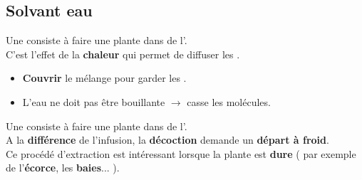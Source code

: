 \subsection{Solvant eau}

\label{infusion}
\begin{Defi}[Infusion]
	
	Une  consiste à faire  une plante dans de l'.\\

	C'est l'effet de la \textbf{chaleur} qui permet de diffuser les .
	
\end{Defi}



\begin{Remarque}
	\begin{itemize}[label = \faPen]
		\item \textbf{Couvrir} le mélange pour garder les .
		\item L'eau ne doit pas être bouillante $\longrightarrow$ casse les molécules.
	\end{itemize}
\end{Remarque}

\label{decoction}
\begin{Defi}[Décoction]
	
	Une  consiste à faire  une plante dans de l'.\\

	A la \textbf{différence} de l'infusion, la \textbf{décoction} demande un \textbf{départ à froid}. \\
	
	Ce procédé d'extraction est intéressant lorsque la plante est \textbf{dure} ( par exemple de l'\textbf{écorce}, les \textbf{baies}... ).

\end{Defi}

